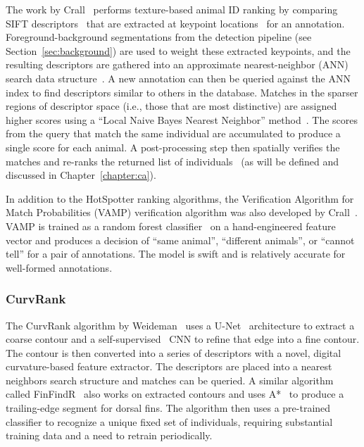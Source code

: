 The work by Crall~\cite{crall_identifying_2017} performs texture-based animal ID ranking by comparing SIFT descriptors~\cite{lowe_distinctive_2004} that are extracted at keypoint locations~\cite{perdoch_efficient_2009} for an annotation.  Foreground-background segmentations from the detection pipeline (see Section~\ref{sec:background}) are used to weight these extracted keypoints, and the resulting descriptors are gathered into an approximate nearest-neighbor (ANN) search data structure~\cite{muja_fast_2009}.  A new annotation can then be queried against the ANN index to find descriptors similar to others in the database.  Matches in the sparser regions of descriptor space (i.e., those that are most distinctive) are assigned higher scores using a ``Local Naive Bayes Nearest Neighbor'' method~\cite{mccann_local_2012}.  The scores from the query that match the same individual are accumulated to produce a single score for each animal.  A post-processing step then spatially verifies the matches and re-ranks the returned list of individuals~\cite{philbin_object_2007} (as will be defined and discussed in Chapter~\ref{chapter:ca}).

In addition to the HotSpotter ranking algorithms, the Verification Algorithm for Match Probabilities (VAMP) verification algorithm was also developed by Crall~\cite{crall_identifying_2017}.  VAMP is trained as a random forest classifier~\cite{breiman_random_2001,pal_random_2005} on a hand-engineered feature vector and produces a decision of ``same animal'', ``different animals'', or ``cannot tell'' for a pair of annotations.  The model is swift and is relatively accurate for well-formed annotations.

\subsubsection{CurvRank}

The CurvRank algorithm by Weideman~\cite{weideman_integral_2017,weideman_contour-based_2019,weideman_extracting_2020} uses a U-Net~\cite{ronneberger_u-net:_2015} architecture to extract a coarse contour and a self-supervised~\cite{kolesnikov_revisiting_2019} CNN to refine that edge into a fine contour.  The contour is then converted into a series of descriptors with a novel, digital curvature-based feature extractor.  The descriptors are placed into a nearest neighbors search structure and matches can be queried.  A similar algorithm called FinFindR~\cite{blount_flukebookcontinuing_2020,thompson_finfindr_2019} also works on extracted contours and uses A*~\cite{hart_formal_1968} to produce a trailing-edge segment for dorsal fins.  The algorithm then uses a pre-trained classifier to recognize a unique fixed set of individuals, requiring substantial training data and a need to retrain periodically.

